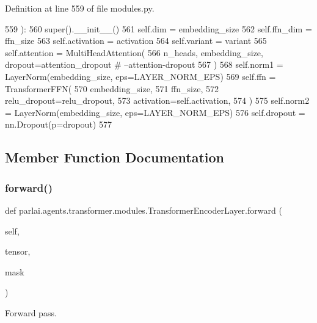 Definition at line 559 of file modules.\+py.


\begin{DoxyCode}
559     ):
560         super().\_\_init\_\_()
561         self.dim = embedding\_size
562         self.ffn\_dim = ffn\_size
563         self.activation = activation
564         self.variant = variant
565         self.attention = MultiHeadAttention(
566             n\_heads, embedding\_size, dropout=attention\_dropout  \textcolor{comment}{# --attention-dropout}
567         )
568         self.norm1 = LayerNorm(embedding\_size, eps=LAYER\_NORM\_EPS)
569         self.ffn = TransformerFFN(
570             embedding\_size,
571             ffn\_size,
572             relu\_dropout=relu\_dropout,
573             activation=self.activation,
574         )
575         self.norm2 = LayerNorm(embedding\_size, eps=LAYER\_NORM\_EPS)
576         self.dropout = nn.Dropout(p=dropout)
577 
\end{DoxyCode}


\subsection{Member Function Documentation}
\mbox{\label{classparlai_1_1agents_1_1transformer_1_1modules_1_1TransformerEncoderLayer_aba0474eb3a08b6c482648adc0804776e}} 
\subsubsection{\texorpdfstring{forward()}{forward()}}
{\footnotesize\ttfamily def parlai.\+agents.\+transformer.\+modules.\+Transformer\+Encoder\+Layer.\+forward (\begin{DoxyParamCaption}\item[{}]{self,  }\item[{}]{tensor,  }\item[{}]{mask }\end{DoxyParamCaption})}

\begin{DoxyVerb}Forward pass.
\end{DoxyVerb}
 

